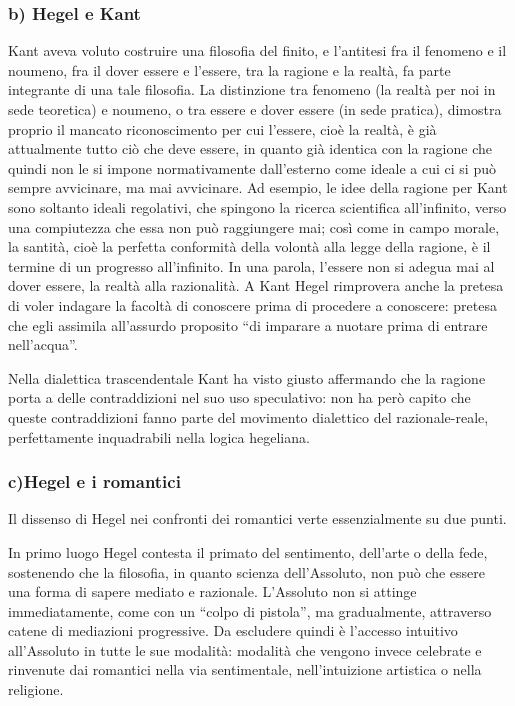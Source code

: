 \documentclass[a4paper,12pt,oneside,openany]{book}%
\begin{document}
\subsubsection*{b) Hegel e Kant}

Kant aveva voluto costruire una filosofia del finito, e l’antitesi fra il fenomeno e il noumeno, fra il dover essere e l’essere, tra la ragione e la realtà, fa parte integrante di una tale filosofia. La distinzione tra fenomeno (la realtà per noi in sede teoretica) e noumeno, o tra essere e dover essere (in sede pratica), dimostra proprio il mancato riconoscimento per cui l’essere, cioè la realtà, è già attualmente tutto ciò che deve essere, in quanto già identica con la ragione che quindi non le si impone normativamente dall’esterno come ideale a cui ci si può sempre avvicinare, ma mai avvicinare. Ad esempio, le idee della ragione per Kant sono soltanto ideali regolativi, che spingono la ricerca scientifica all’infinito, verso una compiutezza che essa non può raggiungere mai; così come in campo morale, la santità, cioè la perfetta conformità della volontà alla legge della ragione, è il termine di un progresso all’infinito. In una parola, l’essere non si adegua mai al dover essere, la realtà alla razionalità. A Kant Hegel rimprovera anche la pretesa di voler indagare la facoltà di conoscere prima di procedere a conoscere: pretesa che egli assimila all’assurdo proposito “di imparare a nuotare prima di entrare nell’acqua”.

Nella dialettica trascendentale Kant ha visto giusto affermando che la ragione porta a delle contraddizioni nel suo uso speculativo: non ha però capito che queste contraddizioni fanno parte del movimento dialettico del razionale-reale, perfettamente inquadrabili nella logica hegeliana.

\subsubsection*{c)Hegel e i romantici}

Il dissenso di Hegel nei confronti dei romantici verte essenzialmente su due punti.

In primo luogo Hegel contesta il primato del sentimento, dell’arte o della fede, sostenendo che la filosofia, in quanto scienza dell’Assoluto, non può che essere una forma di sapere mediato e razionale. L’Assoluto non si attinge immediatamente, come con un “colpo di pistola”, ma gradualmente, attraverso catene di mediazioni progressive. Da escludere quindi è l’accesso intuitivo all’Assoluto in tutte le sue modalità: modalità che vengono invece celebrate e rinvenute dai romantici nella via sentimentale, nell’intuizione artistica o nella religione.
\end{document}
